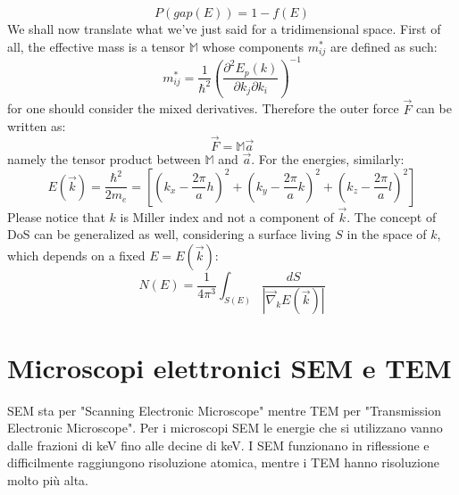 \documentclass{book}
\begin{document}
                        $$P(gap(E)) = 1- f(E)$$
                        We shall now translate what we've just said for a tridimensional space. First of all, the effective mass is a tensor $\mathbb{M}$ whose components $m_{ij} ^{*}$ are defined as such:
                        $$m_{ij} ^{*} = \frac{1}{\hbar ^{2}} (\frac{\partial^{2}E_{p}(k)}{\partial k_{j}\partial k_{i}}) ^{-1}$$
                        for one should consider the mixed derivatives. Therefore the outer force $\vec{F}$ can be written as:
                        $$\vec{F} = \mathbb{M} \vec{a}$$
                        namely the tensor product between $\mathbb{M}$ and $\vec{a}$.
                        For the energies, similarly:
                        $$E(\vec{k}) = \frac{\hbar ^{2}}{2m_{e}} = [(k_{x} - \frac{2 \pi}{a}h)^{2}+(k_{y} - \frac{2 \pi}{a}k)^{2}+(k_{z} - \frac{2 \pi}{a}l)^{2}]$$
                        Please notice that $k$ is Miller index and not a component of $\vec{k}$.
                        The concept of DoS can be generalized as well, considering a surface living $S$ in the space of $k$, which depends on a fixed $E =E(\vec{k})$:
                        $$N(E) = \frac{1}{4 \pi^{3}} \int_{S(E)} \frac{dS}{|\vec{\nabla}_{k}E(\vec{k})|}$$
                       

            \section{Microscopi elettronici SEM e TEM}
                SEM sta per "Scanning Electronic Microscope" mentre TEM per "Transmission Electronic Microscope". 
                Per i microscopi SEM le energie che si utilizzano vanno dalle frazioni di keV fino 
                alle decine di keV. I SEM funzionano in riflessione e difficilmente raggiungono risoluzione atomica, mentre 
                i TEM hanno risoluzione molto più alta.
\end{document}
